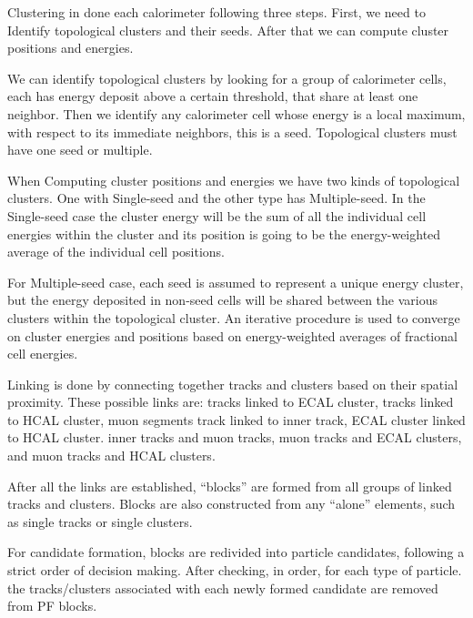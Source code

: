 
Clustering in done each calorimeter following three steps. First, we need to Identify topological clusters and their seeds. After that we can compute cluster positions and energies.  

We can identify topological clusters by looking for a group of calorimeter cells, each has energy deposit above a certain threshold, that share at least one neighbor. Then we identify any calorimeter cell whose energy is a local maximum, with respect to its immediate neighbors, this is a seed. Topological clusters must have one seed or multiple. 

When Computing cluster positions and energies we have two kinds of topological clusters. One with Single-seed and the other type has Multiple-seed. In the Single-seed case the cluster energy will be the sum of all the individual cell energies within the cluster and its position is going to be the energy-weighted average of the individual cell positions. 

For Multiple-seed case, each seed is assumed to represent a unique energy cluster, but the energy deposited in non-seed cells will be shared between the various clusters within the topological cluster.  An iterative procedure is used to converge on cluster energies and positions based on energy-weighted averages of fractional cell energies.

Linking is done by connecting together tracks and clusters based on their spatial proximity. These possible links are: tracks linked to ECAL cluster, tracks linked to HCAL cluster, muon segments track linked to inner track, ECAL cluster linked to HCAL cluster. inner tracks and muon tracks, muon tracks and ECAL clusters, and muon tracks and HCAL clusters. 

After all the links are established, “blocks” are formed from all groups of linked tracks and clusters. Blocks are also constructed from any “alone” elements, such as single tracks or single clusters. 

For candidate formation, blocks are redivided into particle candidates, following a strict order of decision making. After checking, in order, for each type of particle. the tracks/clusters associated with each newly formed candidate are removed from PF blocks.

